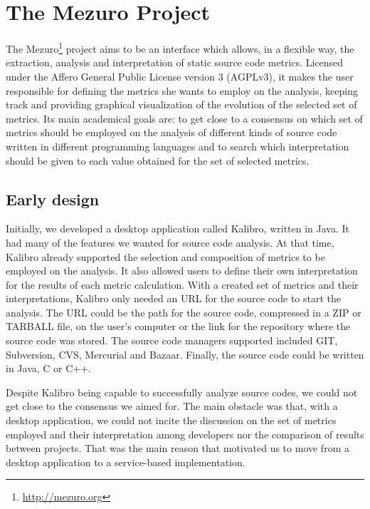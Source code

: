 \newpage
\section{The Mezuro Project}
\label{sec:mezuro}

The Mezuro\footnote{\url{http://mezuro.org}} project aims to be an interface which allows, in a flexible way, the extraction, analysis and interpretation of static source code metrics. Licensed under the Affero General Public License version 3 (AGPLv3), it makes the user responsible for defining the metrics she wants to employ on the analysis, keeping track and providing graphical visualization of the evolution of the selected set of metrics. Its main academical goals are: to get close to a consensus on which set of metrics should be employed on the analysis of different kinds of source code written in different programming languages and to search which interpretation should be given to each value obtained for the set of selected metrics.

\subsection{Early design}
\label{subsec:early-design}

Initially, we developed a desktop application called Kalibro, written in Java. It had many of the features we wanted for source code analysis. At that time, Kalibro already supported the selection and composition of metrics to be employed on the analysis. It also allowed users to define their own interpretation for the results of each metric calculation. With a created set of metrics and their interpretations, Kalibro only needed an URL for the source code to start the analysis. The URL could be the path for the source code, compressed in a ZIP or TARBALL file, on the user's computer or the link for the repository where the source code was stored. The source code managers supported included GIT, Subversion, CVS, Mercurial and Bazaar. Finally, the source code could be written in Java, C or C++.

Despite Kalibro being capable to successfully analyze source codes, we could not get close to the consensus we aimed for. The main obstacle was that, with a desktop application, we could not incite the discussion on the set of metrics employed and their interpretation among developers nor the comparison of results between projects. That was the main reason that motivated us to move from a desktop application to a service-based implementation.

